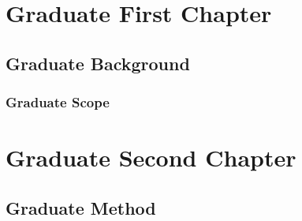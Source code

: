 \documentclass[degree=master, academic=true, fontset=fandol]{nwputhesis}
\begin{document}
\START
\showoutput

\frontmatter
\tableofcontents

\mainmatter
\chapter{Graduate First Chapter}
\section{Graduate Background}
\subsection{Graduate Scope}

\chapter{Graduate Second Chapter}
\section{Graduate Method}

\clearpage
\OMIT
\end{document}

